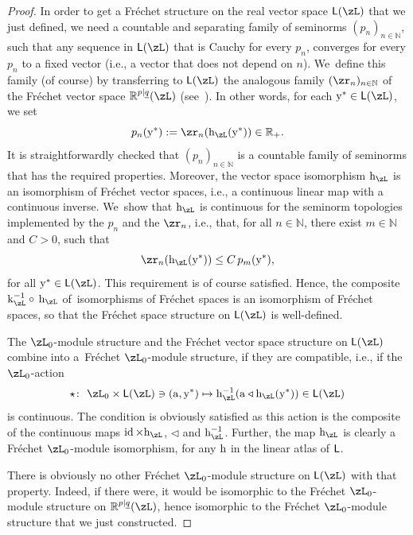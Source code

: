\documentclass[pdftex]{sigma}%
\newcommand{\op}[1]{\operatorname{#1}}
\newcommand{\R}{{\mathbb R}}
\def\ul{\underline}
\def\ul{\underline}
\newcommand{\0}{\otimes}
\newcommand{\id}{\op{id}}
\numberwithin{equation}{section}
\begin{document}
\begin{proof}
In order to get a Fr\'echet structure on the real vector space ${\sf L}(\zL)$ that we just defined, we need a countable and separating family of seminorms $(p_n)_{n\in\mathbb{N}}$, such that any sequence in ${\sf L}(\zL)$ that is Cauchy for every $p_n$, converges for every $p_n$ to a fixed vector (i.e., a vector that does not depend on $n$). We~define this family (of course) by transferring to ${\sf L}(\zL)$ the analogous family $(\zr_n)_{n\in\mathbb{N}}$ of the Fr\'echet vector space $\R^{p|\ul q}(\zL)$ (see~\cite[Theorem 14]{Bruce:2018}). In other words, for each ${\rm y}^*\in{\sf L}(\zL)$, we set
\[
p_n({\rm y}^*):=\zr_n({\rm h}_\zL({\rm y}^*))\in\R_+.
\]
It is straightforwardly checked that $(p_n)_{n\in\mathbb{N}}$ is a countable family of seminorms that has the required properties. Moreover, the vector space isomorphism ${\rm h}_\zL$ is an isomorphism of Fr\'echet vector spaces, i.e., a continuous linear map with a continuous inverse. We~show that ${\rm h}_\zL$ is continuous for the seminorm topologies implemented by the $p_n$ and the $\zr_n$, i.e., that, for all $n\in\mathbb{N}$, there exist $m\in\mathbb{N}$ and $C>0$, such that
\[
\zr_n({\rm h}_\zL({\rm y}^*))\le C\, p_m({\rm y}^*),
\]
for all ${\rm y}^*\in{\sf L}(\zL)$. This requirement is of course satisfied. Hence, the composite ${\rm k}_\zL^{-1}\circ\, {\rm h}_\zL$ of~isomorphisms of Fr\'echet spaces is an isomorphism of Fr\'echet spaces, so that the Fr\'echet space structure on ${\sf L}(\zL)$ is well-defined.

The $\zL_0$-module structure and the Fr\'echet vector space structure on ${\sf L}(\zL)$ combine into a~Fr\'echet $\zL_0$-module structure, if they are compatible, i.e., if the $\zL_0$-action \begin{gather}\label{L0AL}
\star\colon\ \zL_0\times {\sf L}(\zL)\ni({\rm a},{\rm y}^*)\mapsto {\rm h}_\zL^{-1}({\rm a}\triangleleft{\rm h}_\zL({\rm y}^*))\in {\sf L}(\zL)
\end{gather}
is continuous. The condition is obviously satisfied as this action is the composite of the continuous maps $\id\times {\rm h}_\zL$, $\triangleleft$ and ${\rm h}_\zL^{-1}$. Further, the map ${\rm h}_\zL$ is clearly a Fr\'echet $\zL_0$-module isomorphism, for any $\rm h$ in the linear atlas of $\sf L$.

There is obviously no other Fr\'echet $\zL_0$-module structure on ${\sf L}(\zL)$ with that property. Indeed, if there were, it would be isomorphic to the Fr\'echet $\zL_0$-module structure on $\R^{p|\ul q}(\zL)$, hence isomorphic to the Fr\'echet $\zL_0$-module structure that we just constructed. \end{proof}
\end{document}
